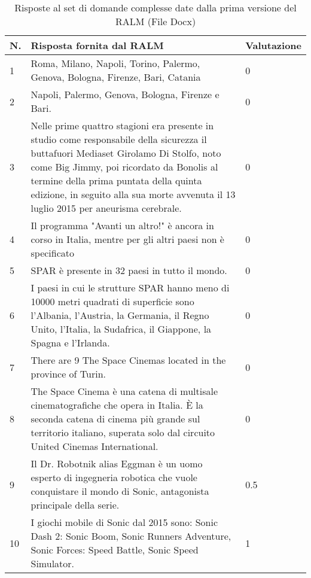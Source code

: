 \begin{table}[H]
    \centering
    \begin{tabular}{|p{0.5cm} |p{6cm} |p{2cm}|}
        \hline
        \textbf{N}. & \textbf{Risposta fornita dal RALM} & \textbf{Valutazione} \\
        \hline
        1 & Roma, Milano, Napoli, Torino, Palermo, Genova, Bologna, Firenze, Bari, Catania & 0 \\
        \hline
        2 & Napoli, Palermo, Genova, Bologna, Firenze e Bari. & 0 \\
        \hline
        3 & Nelle prime quattro stagioni era presente in studio come responsabile della sicurezza il buttafuori Mediaset Girolamo Di Stolfo, noto come Big Jimmy, poi ricordato da Bonolis al termine della prima puntata della quinta edizione, in seguito alla sua morte avvenuta il 13 luglio 2015 per aneurisma cerebrale. & 0 \\
        \hline
        4 & Il programma "Avanti un altro!" è ancora in corso in Italia, mentre per gli altri paesi non è specificato & 0 \\
        \hline
        5 & SPAR è presente in 32 paesi in tutto il mondo. & 0 \\
        \hline
        6 & I paesi in cui le strutture SPAR hanno meno di 10000 metri quadrati di superficie sono l'Albania, l'Austria, la Germania, il Regno Unito, l'Italia, la Sudafrica, il Giappone, la Spagna e l'Irlanda. & 0 \\
        \hline
        7 & There are 9 The Space Cinemas located in the province of Turin. & 0 \\
        \hline
        8 & The Space Cinema è una catena di multisale cinematografiche che opera in Italia. È la seconda catena di cinema più grande sul territorio italiano, superata solo dal circuito United Cinemas International. & 0 \\
        \hline
        9 & Il Dr. Robotnik alias Eggman è un uomo esperto di ingegneria robotica che vuole conquistare il mondo di Sonic, antagonista principale della serie. & 0.5 \\
        \hline
        10 & I giochi mobile di Sonic dal 2015 sono: Sonic Dash 2: Sonic Boom, Sonic Runners Adventure, Sonic Forces: Speed Battle, Sonic Speed Simulator. & 1 \\
        \hline
    \end{tabular}
    \caption{Risposte al set di domande complesse date dalla prima versione del RALM (File Docx)}
\end{table}


